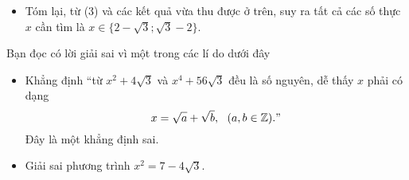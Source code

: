 \begin{bt}
{\begin{itemize}
\begin{itemize}
\begin{align*}
				\end{align*}
				\item[+] Với $x=\sqrt{3}-2$, ta có
				\begin{align*}
					b & =x^2-\dfrac{4}{x}=\left(7-4\sqrt{3}\right)-\dfrac{4}{\sqrt{3}-2}=15\in\mathbb{Z}.\\
					c & =x^2+\dfrac{4}{x}=\left(7-4\sqrt{3}\right)+\dfrac{4}{\sqrt{3}-2}=-1-8\sqrt{3}\notin\mathbb{Z}.
				\end{align*}
			\end{itemize}
			\item Tóm lại, từ (3) và các kết quả vừa thu được ở trên, suy ra tất cả các số thực $x$ cần tìm là $x\in\{2-\sqrt{3};\sqrt{3}-2\}$.
		\end{itemize}
		\begin{nx}
			Bạn đọc có lời giải sai vì một trong các lí do dưới đây
			\begin{itemize}
				\item Khẳng định ``từ $x^2+4\sqrt{3}$ và $x^4+56\sqrt{3}$ đều là số nguyên, dễ thấy $x$ phải có dạng
				$$x=\sqrt{a}+\sqrt{b},\ \ (a,b\in\mathbb{Z})."$$
				Đây là một khẳng định sai.
				\item Giải sai phương trình $x^2=7-4\sqrt{3}$.
			\end{itemize}
		\end{nx}
	}
\end{bt}

